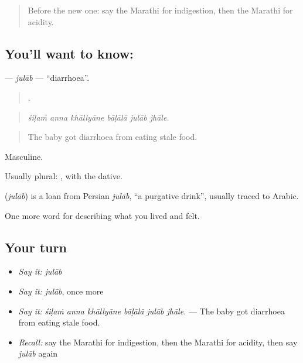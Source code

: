 \label{lesson:MR-C483-julab}



\begin{quote}
Before the new one: say the Marathi for indigestion, then the Marathi for acidity.
\end{quote}

\subsection*{You'll want to know: }
\textbf{} — \emph{julāb} — \textquotedblleft{}diarrhoea\textquotedblright{}.

\begin{quote}
     .
\end{quote}

\begin{quote}
\emph{śiḷaṁ anna khāllyāne bāḷālā julāb jhāle.}
\end{quote}

\begin{quote}
The baby got diarrhoea from eating stale food.
\end{quote}

Masculine.

Usually plural:  , with the dative.

\begin{cousinweb}
\textbf{} (\emph{julāb}) is a loan from Persian \emph{julāb}, \textquotedblleft{}a purgative drink\textquotedblright{}, usually traced to Arabic.
\end{cousinweb}

\begin{grammarlens}[title={What you've built}]
One more word for describing what you lived and felt.
\end{grammarlens}

\subsection*{Your turn}
\begin{itemize}
\raggedright
  \item \emph{Say it:} \emph{julāb}
  \item \emph{Say it:} \emph{julāb}, once more
  \item \emph{Say it:} \emph{śiḷaṁ anna khāllyāne bāḷālā julāb jhāle.} — The baby got diarrhoea from eating stale food.
  \item \emph{Recall:} say the Marathi for indigestion, then the Marathi for acidity, then say \emph{julāb} again
\end{itemize}

